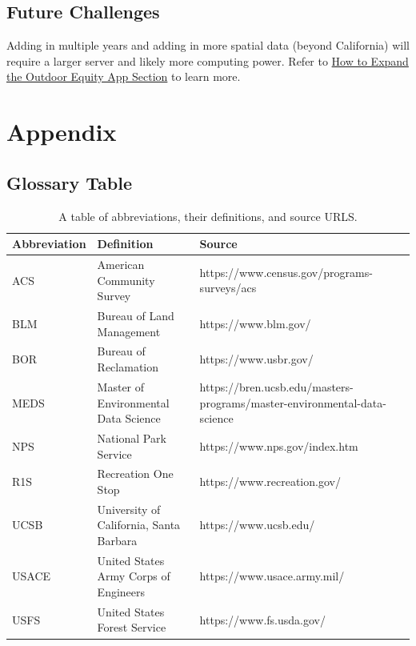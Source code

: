 \documentclass[
  11 pt,
  openany]{book}
\begin{document}
\hypertarget{future-challenges}{%
\section{Future Challenges}\label{future-challenges}}

Adding in multiple years and adding in more spatial data (beyond California) will require a larger server and likely more computing power. Refer to \protect\hyperlink{how-to-expand-the-outdoor-equity-app}{How to Expand the Outdoor Equity App Section} to learn more.

\hypertarget{appendix}{%
\chapter{Appendix}\label{appendix}}

\newpage

\hypertarget{glossary-table}{%
\section{Glossary Table}\label{glossary-table}}

\begin{table}

\caption{\label{tab:glossary-table}A table of abbreviations, their definitions, and source URLS.}
\begin{tabu} to 
\hline
Abbreviation & Definition & Source\\
\hline
ACS & American Community Survey & https://www.census.gov/programs-surveys/acs\\
\hline
BLM & Bureau of Land Management & https://www.blm.gov/\\
\hline
BOR & Bureau of Reclamation & https://www.usbr.gov/\\
\hline
MEDS & Master of Environmental Data Science & https://bren.ucsb.edu/masters-programs/master-environmental-data-science\\
\hline
NPS & National Park Service & https://www.nps.gov/index.htm\\
\hline
R1S & Recreation One Stop & https://www.recreation.gov/\\
\hline
UCSB & University of California, Santa Barbara & https://www.ucsb.edu/\\
\hline
USACE & United States Army Corps of Engineers & https://www.usace.army.mil/\\
\hline
USFS & United States Forest Service & https://www.fs.usda.gov/\\
\hline
\end{tabu}
\end{table}
\end{document}
